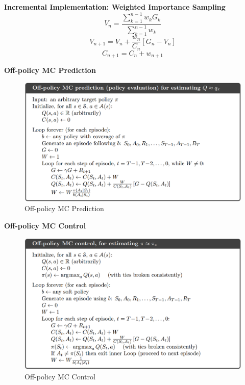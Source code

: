 \documentclass{article}
\begin{document}
\noindent
\textbf{Incremental Implementation: Weighted Importance Sampling}
\begin{equation}
V_{n}=\frac{\sum_{k=1}^{n-1} w_{k} G_{k}}{\sum_{k=1}^{n-1} w_{k}}
\end{equation}
\begin{equation}
V_{n+1}=V_{n}+\frac{w_{n}}{C_{n}}\left[G_{n}-V_{n}\right]
\end{equation}
\begin{equation}
C_{n+1}=C_{n}+w_{n+1}
\end{equation}

\newpage
\noindent
\textbf{Off-policy MC Prediction}

\begin{figure}[h]
\includegraphics[scale=0.25]{offpolicy_mc_prediction}
\centering
\caption{Off-policy MC Prediction}
\end{figure}

\noindent
\textbf{Off-policy MC Control}

\begin{figure}[h]
\includegraphics[scale=0.25]{offpolicy_mc_control}
\centering
\caption{Off-policy MC Control}
\end{figure}
\end{document}
